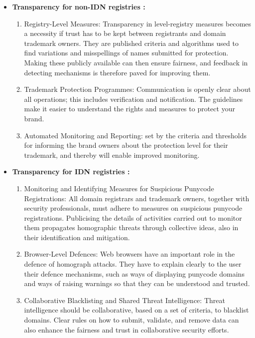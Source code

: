 \begin{itemize}
 \item \textbf{Transparency for non-IDN registries : } 

 \begin{enumerate}
  \item Registry-Level Measures: Transparency in level-registry measures becomes a necessity if trust has to be kept between registrants and domain trademark owners. They are published criteria and algorithms used to find variations and misspellings of names submitted for protection. Making these publicly available can then ensure fairness, and feedback in detecting mechanisms is therefore paved for improving them.
  \item Trademark Protection Programmes: Communication is openly clear about all operations; this includes verification and notification. The guidelines make it easier to understand the rights and measures to protect your brand.
  \item Automated Monitoring and Reporting: set by the criteria and thresholds for informing the brand owners about the protection level for their trademark, and thereby will enable improved monitoring.
  
\end{enumerate}
 
 \item \textbf{Transparency for IDN registries  : } 

  \begin{enumerate}
  \item Monitoring and Identifying Measures for Suspicious Punycode Registrations: All domain registrars and trademark owners, together with security professionals, must adhere to measures on suspicious punycode registrations. Publicising the details of activities carried out to monitor them propagates homographic threats through collective ideas, also in their identification and mitigation.
  
  \item Browser-Level Defences: Web browsers have an important role in the defence of homograph attacks. They have to explain clearly to the user their defence mechanisms, such as ways of displaying punycode domains and ways of raising warnings so that they can be understood and trusted.
  
  \item Collaborative Blacklisting and Shared Threat Intelligence: Threat intelligence should be collaborative, based on a set of criteria, to blacklist domains. Clear rules on how to submit, validate, and remove data can also enhance the fairness and trust in collaborative security efforts.
\end{enumerate}
  
  
\end{itemize}

